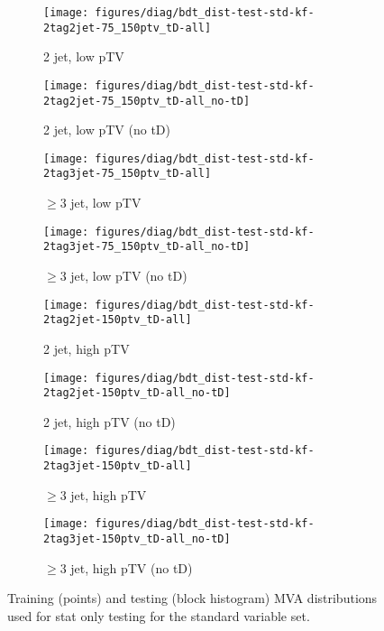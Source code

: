 \begin{figure}[!htbp]\captionsetup{justification=centering}
  \centering
  \begin{subfigure}[t]{0.49\textwidth}\centering\texttt{[image: figures/diag/bdt\_dist-test-std-kf-2tag2jet-75\_150ptv\_tD-all]}\caption{2 jet, low pTV}\end{subfigure}
  \begin{subfigure}[t]{0.49\textwidth}\centering\texttt{[image: figures/diag/bdt\_dist-test-std-kf-2tag2jet-75\_150ptv\_tD-all\_no-tD]}\caption{2 jet, low pTV (no tD)}\end{subfigure}
  \begin{subfigure}[t]{0.49\textwidth}\centering\texttt{[image: figures/diag/bdt\_dist-test-std-kf-2tag3jet-75\_150ptv\_tD-all]}\caption{$\ge3$ jet, low pTV}\end{subfigure}
  \begin{subfigure}[t]{0.49\textwidth}\centering\texttt{[image: figures/diag/bdt\_dist-test-std-kf-2tag3jet-75\_150ptv\_tD-all\_no-tD]}\caption{$\ge3$ jet, low pTV (no tD)}\end{subfigure}
  \begin{subfigure}[t]{0.49\textwidth}\centering\texttt{[image: figures/diag/bdt\_dist-test-std-kf-2tag2jet-150ptv\_tD-all]}\caption{2 jet, high pTV}\end{subfigure}
  \begin{subfigure}[t]{0.49\textwidth}\centering\texttt{[image: figures/diag/bdt\_dist-test-std-kf-2tag2jet-150ptv\_tD-all\_no-tD]}\caption{2 jet, high pTV (no tD)}\end{subfigure}
  \begin{subfigure}[t]{0.49\textwidth}\centering\texttt{[image: figures/diag/bdt\_dist-test-std-kf-2tag3jet-150ptv\_tD-all]}\caption{$\ge3$ jet, high pTV}\end{subfigure}
  \begin{subfigure}[t]{0.49\textwidth}\centering\texttt{[image: figures/diag/bdt\_dist-test-std-kf-2tag3jet-150ptv\_tD-all\_no-tD]}\caption{$\ge3$ jet, high pTV (no tD)}\end{subfigure}
  \caption{Training (points) and testing (block histogram) MVA distributions used for stat only testing for the standard variable set.}
  \label{fig:std-kf-testing}
\end{figure}

